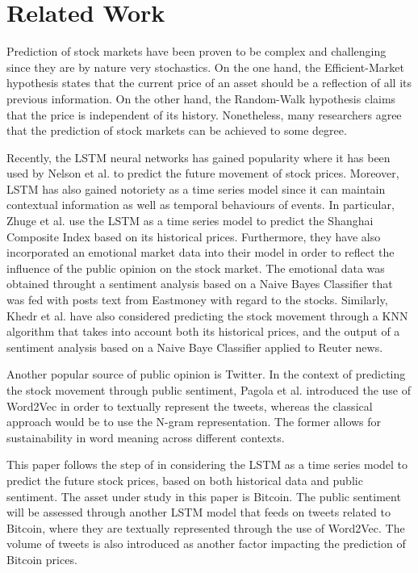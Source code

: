 \documentclass[conference]{IEEEtran}
\begin{document}
\section{Related Work}
\par Prediction of stock markets have been proven to be complex and challenging since they are by nature very stochastics. On the one hand, the Efficient-Market hypothesis states that the current price of an asset should be a reflection of all its previous information. On the other hand, the Random-Walk hypothesis claims that the price is independent of its history. Nonetheless, many researchers agree that the prediction of stock markets can be achieved to some degree.  
\par Recently, the LSTM neural networks has gained popularity where it has been used by Nelson et al. \cite{LSTM Stock} to predict the future movement of stock prices. Moreover, LSTM has also gained notoriety as a time series model since it can maintain contextual information as well as temporal behaviours of events. In particular, Zhuge et al. \cite{LSTM Emotional} use the LSTM as a time series model to predict the Shanghai Composite Index based on its historical prices. Furthermore, they have also incorporated an emotional market data into their model in order to reflect the influence of the public opinion on the stock market. The emotional data was obtained throught a sentiment analysis based on a Naive Bayes Classifier that was fed with posts text from Eastmoney with regard to the stocks. Similarly, Khedr et al. \cite{Behavior} have also considered predicting the stock movement through a KNN algorithm that takes into account both its historical prices, and the output of a sentiment analysis based on a Naive Baye Classifier applied to Reuter news. 
\par Another popular source of public opinion is Twitter. In the context of predicting the stock movement through public sentiment, Pagola et al. \cite{word2vec Twitter} introduced the use of Word2Vec in order to textually represent the tweets, whereas the classical approach would be to use the N-gram representation. The former allows for sustainability in word meaning across different contexts.
\par This paper follows the step of \cite{LSTM Emotional} in considering the LSTM as a time series model to predict the future stock prices, based on both historical data and public sentiment. The asset under study in this paper is Bitcoin. The public sentiment will be assessed through another LSTM model that feeds on tweets related to Bitcoin, where they are textually represented through the use of Word2Vec. The volume of tweets is also introduced as another factor impacting the prediction of Bitcoin prices. 
\end{document}
